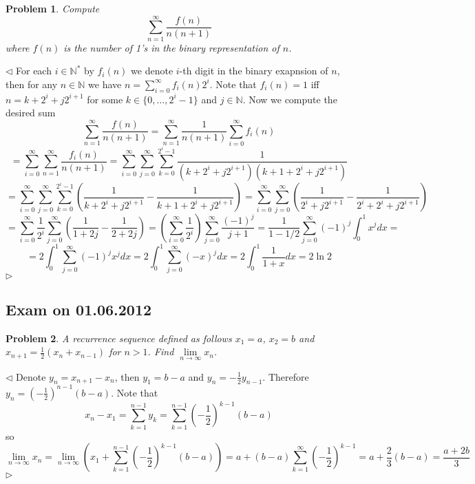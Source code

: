 \documentclass[12pt]{article}
\newtheorem{problem}{Problem}[subsection]
\newenvironment{solution}{\par $\triangleleft$}{$\triangleright$}
\begin{document}
\begin{problem} Compute
$$
    \sum_{n=1}^\infty\frac{f(n)}{n(n+1)}
$$
where $f(n)$ is the number of 1's in the binary representation of $n$.
\end{problem}
\begin{solution} For each $i\in\mathbb{N}^*$ by $f_i(n)$ we denote $i$-th digit
    in the binary exapnsion of $n$, then for any $n\in\mathbb{N}$ we have
    $n=\sum_{i=0}^\infty f_i(n) 2^i$. Note that $f_i(n)=1$ iff $n=k+2^i+j
        2^{i+1}$ for some $k\in \{0,\ldots,2^i-1\}$ and $j\in\mathbb{N}$. Now we
    compute the desired sum
    $$
        \sum_{n=1}^\infty\frac{f(n)}{n(n+1)}
        =\sum_{n=1}^\infty\frac{1}{n(n+1)}\sum_{i=0}^\infty f_i(n)
    $$
    $$
        =\sum_{i=0}^\infty\sum_{n=1}^\infty \frac{f_i(n)}{n(n+1)}
        =\sum_{i=0}^\infty\sum_{j=0}^\infty\sum_{k=0}^{2^i-1}
        \frac{1}{(k+2^i+j 2^{i+1})(k+1+2^i+j2^{i+1})}
    $$
    $$
        =\sum_{i=0}^\infty\sum_{j=0}^\infty\sum_{k=0}^{2^i-1}
        \left(\frac{1}{k+2^i+j 2^{i+1}}-\frac{1}{k+1+2^i+j 2^{i+1}}\right)
        =\sum_{i=0}^\infty\sum_{j=0}^\infty
        \left(\frac{1}{2^i+j 2^{i+1}}-\frac{1}{2^i+2^i+j 2^{i+1}}\right)
    $$
    $$
        =\sum_{i=0}^\infty\frac{1}{2^i}\sum_{j=0}^\infty
        \left(\frac{1}{1+2j}-\frac{1}{2+2j}\right)
        =\left(\sum_{i=0}^\infty\frac{1}{2^i}\right)\sum_{j=0}^\infty
        \frac{{(-1)}^j}{j+1}
        =\frac{1}{1-1/2}\sum_{j=0}^\infty{(-1)}^j\int_0^1 x^j dx=
    $$
    $$
        =2\int_0^1 \sum_{j=0}^\infty{(-1)}^j x^j dx
        =2\int_0^1 \sum_{j=0}^\infty{(-x)}^j dx
        =2\int_0^1 \frac{1}{1+x} dx
        =2\ln2
    $$
\end{solution}













\newpage

\subsection{Exam on 01.06.2012}

\begin{problem} A recurrence sequence defined as follows $x_1=a$, $x_2=b$ and
$x_{n+1}=\frac{1}{2}(x_n+x_{n-1})$ for $n> 1$. Find $\lim\limits_{n\to\infty}
    x_n$.
\end{problem}
\begin{solution} Denote $y_n=x_{n+1}-x_n$, then $y_1=b-a$ and
    $y_n=-\frac{1}{2}y_{n-1}$. Therefore
    $y_n={\left(-\frac{1}{2}\right)}^{n-1}(b-a)$. Note that
    $$
        x_n-x_1
        =\sum\limits_{k=1}^{n-1} y_k
        =\sum\limits_{k=1}^{n-1} {\left(-\frac{1}{2}\right)}^{k-1}(b-a)
    $$
    so
    $$
        \lim\limits_{n\to\infty} x_n
        =\lim\limits_{n\to\infty}
        \left(
        x_1+
        \sum\limits_{k=1}^{n-1} {\left(-\frac{1}{2}\right)}^{k-1}(b-a)
        \right)
        =a+(b-a)\sum\limits_{k=1}^\infty {\left(-\frac{1}{2}\right)}^{k-1}
        =a+\frac{2}{3}(b-a)
        =\frac{a+2b}{3}
    $$
\end{solution}
\end{document}
